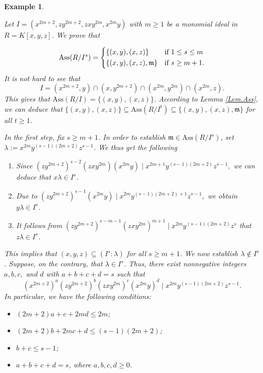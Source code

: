 \documentclass[11pt]{amsart}
\newtheorem{example}[theorem]{Example}
\begin{document}
  \medskip
\begin{example}\label{Ex.Ass.NandP}
\em{
Let $I=(x^{2m+2}, zy^{2m+2}, zxy^{2m}, x^{2m}y)$ with $m\geq 1$  be a monomial ideal in  $R=K[x,y,z]$. We prove  that 

\[
\mathrm{Ass}(R/I^s) =
    \begin{dcases}
    \{(x,y), (x,z)\} & \text{if } 1\leq s\leq m\\
\{(x,y), (x,z),  \mathfrak{m}\}  & \text{if } s\geq m+1. \\
                \end{dcases}
\]
It is not hard to see that   $$I=(x^{2m+2}, y) \cap (x, y^{2m+2}) \cap (x^{2m}, y^{2m}) \cap (x^{2m}, z).$$
This gives that $\mathrm{Ass}(R/I)=\{(x,y), (x,z)\}$. According to   Lemma \ref{Lem.Ass}, we  can deduce   that 
 $ \{(x,y), (x,z)\} \subseteq \mathrm{Ass}(R/I^t) \subseteq \{(x,y), (x,z), \mathfrak{m}\}$ for all $t\geq 1$. 

In the first  step, fix $s\geq m+1$. In order to establish $\mathfrak{m} \in \mathrm{Ass}(R/I^s)$, set $\lambda:=x^{2m}y^{(s-1)(2m+2)}z^{s-1}$. 
 We thus get the following 
 \begin{enumerate}
  \item   Since $(zy^{2m+2})^{s-2} (zxy^{2m})(x^{2m}y) \mid x^{2m+1} y^{(s-1)(2m+2)}z^{s-1},$  we can deduce that  $x\lambda \in I^s$. 
  \item   Due to $(zy^{2m+2})^{s-1} (x^{2m}y) \mid x^{2m} y^{(s-1)(2m+2)+1}z^{s-1},$  we obtain   $y\lambda \in I^s$. 
  \item  It follows from $(zy^{2m+2})^{s-m-1} (zxy^{2m})^{m+1} \mid x^{2m} y^{(s-1)(2m+2)}z^{s}$ that  $z\lambda \in I^s$. 
  \end{enumerate}
  This implies that $(x,y,z) \subseteq (I^s:\lambda)$ for all $s\geq m+1$. We now establish $\lambda \notin I^s$. Suppose, on the contrary, that $\lambda \in I^s$. 
   Thus, there exist nonnegative integers $a,b,c,$ and $d$ with $a+b+c+d=s$  such that 
   $$(x^{2m+2})^a  (zy^{2m+2})^b  (zxy^{2m})^c  (x^{2m}y)^d \mid x^{2m} y^{(s-1)(2m+2)} z^{s-1}.$$
  In particular, we have the following conditions:
  
  \begin{itemize}
\item[(i)] $(2m+2)a+ c+ 2md\leq 2m$;
\item[(ii)] $(2m+2)b+ 2mc+ d \leq (s-1)(2m+2)$; 
\item[(iii)] $b+c \leq s-1$;
\item[(iv)] $a+b+c+d=s$, where $a,b,c,d \geq 0$. 
\end{itemize}
  
}
\end{example}
\end{document}
